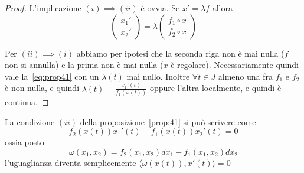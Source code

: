 \begin{proof}
    L'implicazione \({(i)} \implies {(ii)}\) è ovvia. Se \(x'= \lambda f\)
    allora
    \begin{equation}\label{eq:prop41}
\begin{pmatrix}
        x_{1}' \\
        x_{2}'
    \end{pmatrix} = \lambda \begin{pmatrix}
        f_{1}\circ x \\
        f_{2}\circ x
    \end{pmatrix}
    \end{equation}

    Per \({(ii)} \implies {(i)}\) abbiamo per ipotesi che la seconda riga non è
    mai nulla (\(f\) non si annulla) e la prima non è mai nulla (\(x\) è
    regolare). Necessariamente quindi vale la~\eqref{eq:prop41} con un
    \(\lambda{(t)}\) mai nullo. Inoltre \(\forall t \in J\) almeno una fra
    \(f_{1}\) e \(f_{2}\) è non nulla, e quindi \(\lambda{(t)} =
    \frac{x_{1}'{(t)}}{f_{1}{(x{(t)})}}\) oppure l'altra localmente, e quindi è
    continua.
\end{proof}

La condizione \({(ii)}\) della proposizione~\ref{prop:41} si può scrivere come 
\[
  f_{2}{(x{(t)})}x_{1}'{(t)} - f_{1}{(x{(t)})}x_{2}'{(t)} = 0
\]
ossia posto
\begin{equation}\label{eq:diff_associata}
  \omega{(x_{1},x_{2})} = f_{2}{(x_{1}, x_{2})}dx_{1} - f_{1}{(x_{1},
  x_{2})}dx_{2}
\end{equation}
l'uguaglianza diventa semplicemente \(\langle \omega{(x{(t)})}, x'{(t)} \rangle
= 0\) 

